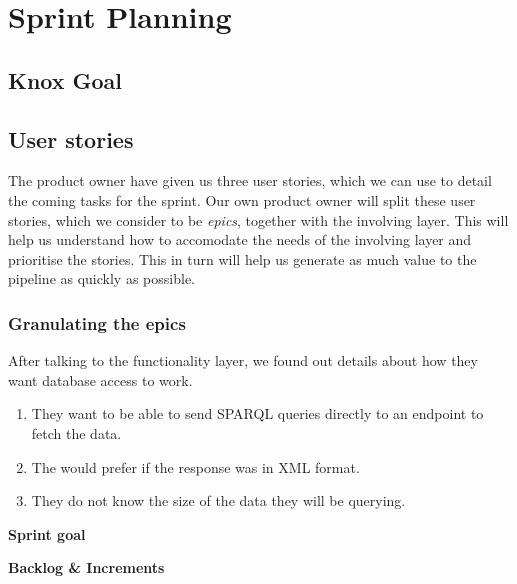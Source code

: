 \section{Sprint Planning}
\subsection{Knox Goal}
\subsection{User stories}
The \knox{} product owner have given us three user stories, which we can use to detail the coming tasks for the sprint.
Our own product owner will split these user stories, which we consider to be \textit{epics}, together with the involving layer. 
This will help us understand how to accomodate the needs of the involving layer and prioritise the stories. 
This in turn will help us generate as much value to the pipeline as quickly as possible.


\subsubsection*{Granulating the epics}
After talking to the functionality layer, we found out details about how they want database access to work. 
\begin{enumerate}
    \item They want to be able to send SPARQL queries directly to an endpoint to fetch the data.
    \item The would prefer if the response was in XML format. 
    \item They do not know the size of the data they will be querying.
\end{enumerate}




\textbf{Sprint goal}


\textbf{Backlog \& Increments}

